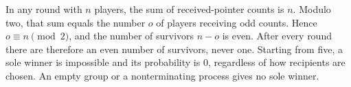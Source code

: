 In any round with $n$ players, the sum of received-pointer counts is $n$. Modulo two, that sum equals the number $o$ of players receiving odd counts. Hence $o\equiv n\pmod2$, and the number of survivors $n-o$ is even. After every round there are therefore an even number of survivors, never one. Starting from five, a sole winner is impossible and its probability is $\boxed0$, regardless of how recipients are chosen. An empty group or a nonterminating process gives no sole winner.
